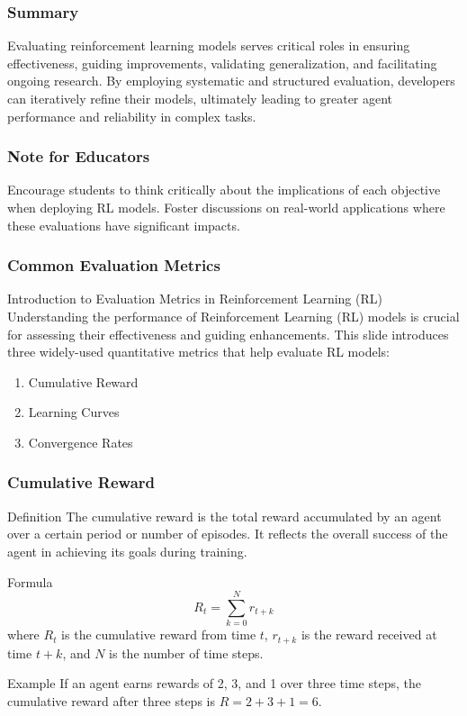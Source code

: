 \documentclass{beamer}
\begin{document}
\begin{frame}[fragile]
    \frametitle{Summary}
    Evaluating reinforcement learning models serves critical roles in ensuring effectiveness, guiding improvements, validating generalization, and facilitating ongoing research. By employing systematic and structured evaluation, developers can iteratively refine their models, ultimately leading to greater agent performance and reliability in complex tasks.
\end{frame}

\begin{frame}[fragile]
    \frametitle{Note for Educators}
    Encourage students to think critically about the implications of each objective when deploying RL models. Foster discussions on real-world applications where these evaluations have significant impacts.
\end{frame}

\begin{frame}[fragile]
    \frametitle{Common Evaluation Metrics}
    
    \begin{block}{Introduction to Evaluation Metrics in Reinforcement Learning (RL)}
        Understanding the performance of Reinforcement Learning (RL) models is crucial for assessing their effectiveness and guiding enhancements. This slide introduces three widely-used quantitative metrics that help evaluate RL models:
    \end{block}
    
    \begin{enumerate}
        \item Cumulative Reward
        \item Learning Curves
        \item Convergence Rates
    \end{enumerate}
\end{frame}

\begin{frame}[fragile]
    \frametitle{Cumulative Reward}
    
    \begin{block}{Definition}
        The cumulative reward is the total reward accumulated by an agent over a certain period or number of episodes. It reflects the overall success of the agent in achieving its goals during training.
    \end{block}
    
    \begin{block}{Formula}
        \begin{equation}
        R_t = \sum_{k=0}^{N} r_{t+k}
        \end{equation}
        where \( R_t \) is the cumulative reward from time \( t \), \( r_{t+k} \) is the reward received at time \( t+k \), and \( N \) is the number of time steps.
    \end{block}
    
    \begin{block}{Example}
        If an agent earns rewards of 2, 3, and 1 over three time steps, the cumulative reward after three steps is \( R = 2 + 3 + 1 = 6 \).
    \end{block}
\end{frame}
\end{document}
